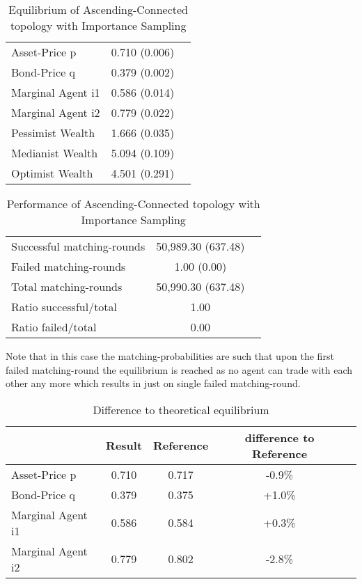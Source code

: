 \documentclass[Bachelorarbeit.tex]{subfiles}
\begin{document}
\begin{table}[H]
	\caption{Equilibrium of Ascending-Connected topology with Importance Sampling}
	\centering
	\begin{tabular} { l c r }
		\hline
		Asset-Price p & 0.710 (0.006) \\
		Bond-Price q & 0.379 (0.002) \\
		Marginal Agent i1 & 0.586 (0.014) \\
		Marginal Agent i2 & 0.779 (0.022) \\
		\hline
		Pessimist Wealth & 1.666 (0.035) \\
		Medianist Wealth & 5.094 (0.109) \\
		Optimist Wealth & 4.501 (0.291) \\
		\hline
	\end{tabular}
\end{table} 

\begin{table}[H]
	\caption{Performance of Ascending-Connected topology with Importance Sampling}
	\centering
	\begin{tabular} { l c r }
		\hline
		Successful matching-rounds & 50,989.30 (637.48) \\
		Failed matching-rounds & 1.00 (0.00) \\
		Total matching-rounds & 50,990.30 (637.48) \\
		\hline
		Ratio successful/total & 1.00 \\
		Ratio failed/total & 0.00 \\
		\hline
	\end{tabular}
\end{table}

Note that in this case the matching-probabilities are such that upon the first failed matching-round the equilibrium is reached as no agent can trade with each other any more which results in just on single failed matching-round.

\begin{table}[H]
	\caption{Difference to theoretical equilibrium}
	\centering
	\begin{tabular} { l c c c r }
		& Result & Reference & difference to Reference \\
		\hline
		Asset-Price p & 0.710 & 0.717 & -0.9\% \\
		Bond-Price q & 0.379 & 0.375 & +1.0\% \\
		Marginal Agent i1 & 0.586 & 0.584 & +0.3\% \\
		Marginal Agent i2 & 0.779 & 0.802 & -2.8\% \\
		\hline
	\end{tabular}
\end{table}
\end{document}
